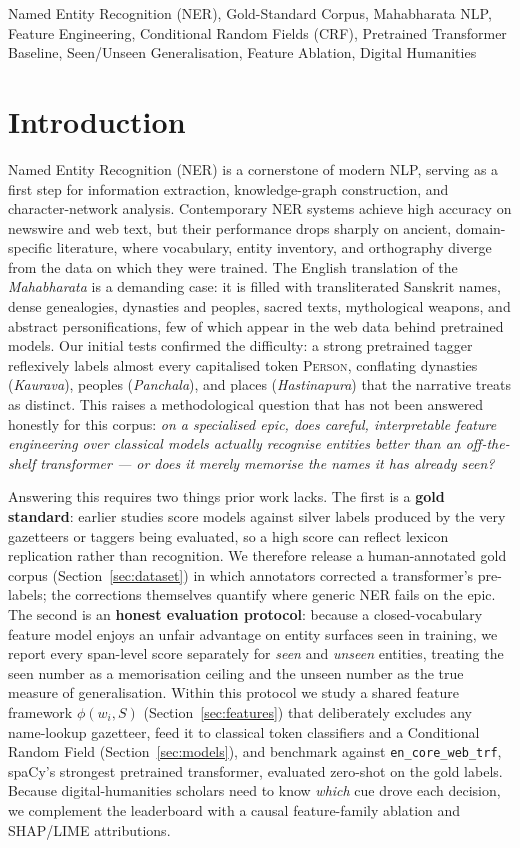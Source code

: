 \documentclass[conference]{IEEEtran}
\begin{document}
\begin{IEEEkeywords}
Named Entity Recognition (NER), Gold-Standard Corpus, Mahabharata NLP, Feature Engineering, Conditional Random Fields (CRF), Pretrained Transformer Baseline, Seen/Unseen Generalisation, Feature Ablation, Digital Humanities
\end{IEEEkeywords}


\section{Introduction}
\label{sec-1}
Named Entity Recognition (NER) is a cornerstone of modern NLP, serving as a first step for information extraction, knowledge-graph construction, and character-network analysis. Contemporary NER systems achieve high accuracy on newswire and web text, but their performance drops sharply on ancient, domain-specific literature, where vocabulary, entity inventory, and orthography diverge from the data on which they were trained. The English translation of the \emph{Mahabharata} is a demanding case: it is filled with transliterated Sanskrit names, dense genealogies, dynasties and peoples, sacred texts, mythological weapons, and abstract personifications, few of which appear in the web data behind pretrained models. Our initial tests confirmed the difficulty: a strong pretrained tagger reflexively labels almost every capitalised token \textsc{Person}, conflating dynasties (\emph{Kaurava}), peoples (\emph{Panchala}), and places (\emph{Hastinapura}) that the narrative treats as distinct. This raises a methodological question that has not been answered honestly for this corpus: \emph{on a specialised epic, does careful, interpretable feature engineering over classical models actually recognise entities better than an off-the-shelf transformer --- or does it merely memorise the names it has already seen?}

Answering this requires two things prior work lacks. The first is a \textbf{gold standard}: earlier studies score models against silver labels produced by the very gazetteers or taggers being evaluated, so a high score can reflect lexicon replication rather than recognition. We therefore release a human-annotated gold corpus (Section~\ref{sec:dataset}) in which annotators corrected a transformer's pre-labels; the corrections themselves quantify where generic NER fails on the epic. The second is an \textbf{honest evaluation protocol}: because a closed-vocabulary feature model enjoys an unfair advantage on entity surfaces seen in training, we report every span-level score separately for \emph{seen} and \emph{unseen} entities, treating the seen number as a memorisation ceiling and the unseen number as the true measure of generalisation. Within this protocol we study a shared feature framework $\phi(w_i,S)$ (Section~\ref{sec:features}) that deliberately excludes any name-lookup gazetteer, feed it to classical token classifiers and a Conditional Random Field (Section~\ref{sec:models}), and benchmark against \texttt{en\_core\_web\_trf}, spaCy's strongest pretrained transformer, evaluated zero-shot on the gold labels. Because digital-humanities scholars need to know \emph{which} cue drove each decision, we complement the leaderboard with a causal feature-family ablation and SHAP/LIME attributions.
\end{document}
